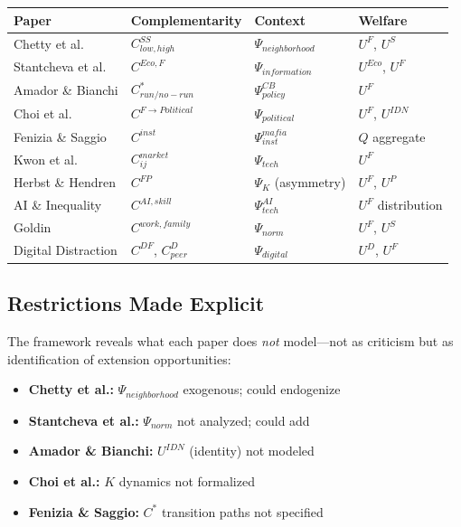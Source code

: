 \begin{center}
\renewcommand{\arraystretch}{1.3}
\begin{tabular}{|l|l|l|l|}
\hline
\textbf{Paper} & \textbf{Complementarity} & \textbf{Context} & \textbf{Welfare} \\
\hline
Chetty et al. & $C^{SS}_{low,high}$ & $\Psi_{neighborhood}$ & $U^F$, $U^S$ \\
Stantcheva et al. & $C^{Eco,F}$ & $\Psi_{information}$ & $U^{Eco}$, $U^F$ \\
Amador \& Bianchi & $C^*_{run/no-run}$ & $\Psi_{policy}^{CB}$ & $U^F$ \\
Choi et al. & $C^{F \to Political}$ & $\Psi_{political}$ & $U^F$, $U^{IDN}$ \\
Fenizia \& Saggio & $C^{inst}$ & $\Psi_{inst}^{mafia}$ & $Q$ aggregate \\
Kwon et al. & $C_{ij}^{market}$ & $\Psi_{tech}$ & $U^F$ \\
Herbst \& Hendren & $C^{FP}$ & $\Psi_K$ (asymmetry) & $U^F$, $U^P$ \\
AI \& Inequality & $C^{AI,skill}$ & $\Psi_{tech}^{AI}$ & $U^F$ distribution \\
Goldin & $C^{work,family}$ & $\Psi_{norm}$ & $U^F$, $U^S$ \\
Digital Distraction & $C^{DF}$, $C^D_{peer}$ & $\Psi_{digital}$ & $U^D$, $U^F$ \\
\hline
\end{tabular}
\end{center}

\subsection{Restrictions Made Explicit}

The framework reveals what each paper does \emph{not} model---not as criticism
but as identification of extension opportunities:

\begin{itemize}
    \item \textbf{Chetty et al.:} $\Psi_{neighborhood}$ exogenous; could endogenize
    \item \textbf{Stantcheva et al.:} $\Psi_{norm}$ not analyzed; could add
    \item \textbf{Amador \& Bianchi:} $U^{IDN}$ (identity) not modeled
    \item \textbf{Choi et al.:} $K$ dynamics not formalized
    \item \textbf{Fenizia \& Saggio:} $C^*$ transition paths not specified
\end{itemize}

